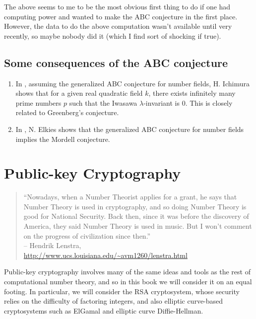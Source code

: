 \documentclass{book}
\begin{document}
The above seems to me to be the most obvious first thing to
do if one had computing power and wanted to make the ABC
conjecture in the first place.  However, the data to do the
above computation wasn't available until very recently,
so maybe nobody did it (which I find sort of shocking if true).

\section{Some consequences of the ABC conjecture}

\begin{enumerate}
\item In \cite{ichimura1998note}, assuming the generalized ABC conjecture for number fields, H. Ichimura shows that for a given real quadratic field $k$, there exists infinitely many prime numbers $p$ such that the Iwasawa $\lambda$-invariant is 0.
This is closely related to Greenberg's conjecture.
\item In \cite{elkies1991abc}, N. Elkies shows that the generalized ABC conjecture for number fields implies the Mordell conjecture.
\end{enumerate}


\chapter{Public-key Cryptography}


\begin{quote}
``Nowadays, when a Number Theorist applies for a grant, he says
that Number Theory is used in cryptography, and so doing Number
Theory is good for National Security. Back then, since it was
before the discovery of America, they said Number Theory is
used in music. But I won't comment on the progress of
civilization since then.''\\-- Hendrik Lenstra,\\ \url{http://www.ucs.louisiana.edu/~avm1260/lenstra.html}
\end{quote}


Public-key cryptography involves many of the same ideas and tools
as the rest of computational number theory, and so in this book
we will consider it on an equal footing.
In particular, we will consider the RSA cryptosystem, whose
security relies on the difficulty of factoring integers,
and also elliptic curve-based cryptosystems
such as ElGamal and elliptic curve Diffie-Hellman.
\end{document}
